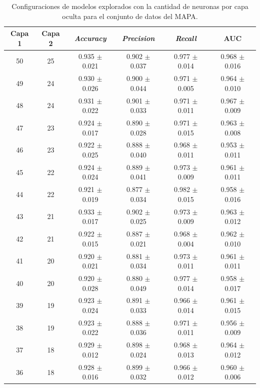 \begin{table}[H]
	\centering
	\caption[Configuraciones de modelos explorados para el conjunto de datos del MAPA.]{Configuraciones de modelos explorados con la cantidad de neuronas por capa oculta para el conjunto de datos del MAPA.}
	\begin{tabular}{c c c c c c}    
		\toprule
		\textbf{Capa 1} & \textbf{Capa 2} & \textbf{\emph{Accuracy}} & \textbf{\emph{Precision}} & \textbf{\emph{Recall}}  & \textbf{AUC}\\
		\midrule
    
       50 & 25	& 0.935 $\pm$ 0.021 & 0.902  $\pm$ 0.037	& 0.977  $\pm$ 0.014 & 0.968  $\pm$ 0.016\\
       49 & 24 & 0.930 $\pm$ 0.026 & 0.900  $\pm$ 0.044 & 0.971  $\pm$ 0.005 & 0.964 $\pm$ 0.010\\
       48 & 24 & 0.931 $\pm$ 0.022 & 0.901 $\pm$ 0.033 & 0.971 $\pm$ 0.011 & 0.967 $\pm$ 0.009\\
       47 & 23 & 0.924 $\pm$ 0.017 & 0.890 $\pm$ 0.028 & 0.971 $\pm$ 0.015 & 0.963 $\pm$ 0.008\\
       46 & 23 & 0.922 $\pm$ 0.025 & 0.888 $\pm$ 0.040 & 0.968 $\pm$ 0.011 & 0.953 $\pm$ 0.011\\
       45 & 22 & 0.924 $\pm$ 0.024 & 0.889 $\pm$ 0.041 & 0.973 $\pm$ 0.009 & 0.961 $\pm$ 0.011\\ 
       44 & 22 & 0.921 $\pm$ 0.019 & 0.877 $\pm$ 0.034 & 0.982 $\pm$ 0.015 & 0.958 $\pm$ 0.016\\ 
       43 & 21 & 0.933 $\pm$ 0.017 & 0.902 $\pm$ 0.025 & 0.973 $\pm$ 0.009 & 0.963 $\pm$ 0.012\\ 
       42 & 21 & 0.922 $\pm$ 0.015 & 0.887 $\pm$ 0.021 & 0.968 $\pm$ 0.004 & 0.962 $\pm$ 0.010\\ 
       41 & 20 & 0.920 $\pm$ 0.021 & 0.881 $\pm$ 0.034 & 0.973 $\pm$ 0.011 & 0.961 $\pm$ 0.011\\ 
       40 & 20 & 0.920 $\pm$ 0.028 & 0.880 $\pm$ 0.049 & 0.977 $\pm$ 0.014 & 0.958 $\pm$ 0.017\\ 
       39 & 19 & 0.923 $\pm$ 0.024 & 0.891 $\pm$ 0.033 & 0.966 $\pm$ 0.014 & 0.961 $\pm$ 0.015\\ 
       38 & 19 & 0.923 $\pm$ 0.022 & 0.888 $\pm$ 0.036 & 0.971 $\pm$ 0.011 & 0.956 $\pm$ 0.009\\ 
       37 & 18 & 0.929 $\pm$ 0.012 & 0.898 $\pm$ 0.024 & 0.968 $\pm$ 0.013 & 0.964 $\pm$ 0.012\\ 
       36 & 18 & 0.928 $\pm$ 0.016 & 0.899 $\pm$ 0.032 & 0.966 $\pm$ 0.012 & 0.960 $\pm$ 0.006\\ 

\end{tabular}
\end{table}
